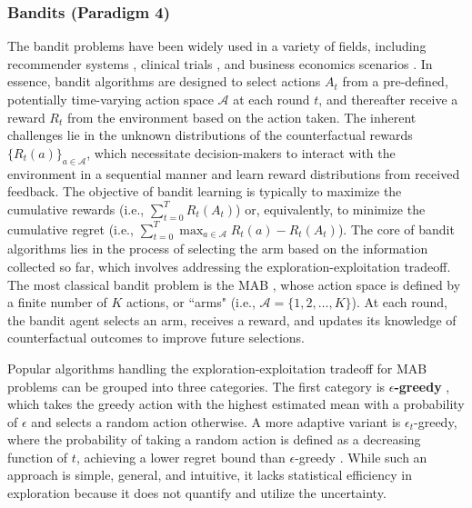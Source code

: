 \subsubsection{Bandits (Paradigm 4)} \label{sec:bandit_optimization}
The bandit problems have been widely used in a variety of fields, including recommender systems \citep{zhou2017large}, clinical trials \citep{durand2018contextual}, and business economics scenarios \citep{shen2015portfolio, wei2023zero}. 
In essence, bandit algorithms are designed to select actions $A_t$ from a pre-defined, potentially time-varying action space $\mathcal{A}$ at each round $t$, and thereafter receive a reward $R_t$ from the environment based on the action taken. 
The inherent challenges lie in the unknown distributions of the counterfactual rewards $\{R_t(a)\}_{a\in \mathcal{A}}$, which necessitate decision-makers to interact with the environment in a sequential manner and learn reward distributions from received feedback. 
The objective of bandit learning is typically to maximize the cumulative rewards (i.e., $\sum_{t=0}^{T}R_t(A_t)$) or, equivalently, to minimize the cumulative regret (i.e., $\sum_{t=0}^{T}\max_{a\in \mathcal{A}}R_t(a) - R_t(A_t)$). 
The core of bandit algorithms lies in the process of selecting the arm based on the information collected so far, which involves addressing the exploration-exploitation tradeoff.
The most classical bandit problem is the \acrshort{MAB} \citep{slivkins2019introduction, bouneffouf2019survey}, whose action space is defined by a finite number of $K$ actions, or ``arms" (i.e., $\mathcal{A} = \{1,2,\dots, K\}$). At each round, the bandit agent selects an arm, receives a reward, and updates its knowledge of counterfactual outcomes to improve future selections.


Popular algorithms handling the exploration-exploitation tradeoff for \acrshort{MAB} problems can be grouped into three categories. 
The first category is \textbf{$\epsilon$-greedy} \citep{sutton1999reinforcement}, which takes the greedy action with the highest estimated mean with a probability of $\epsilon$ and selects a random action otherwise. 
A more adaptive variant is $\epsilon_{t}$-greedy, where the probability of taking a random action is defined as a decreasing function of $t$, achieving a lower regret bound than $\epsilon$-greedy \citep{cesa1998finite, auer2002finite}. 
While such an approach is simple, general, and intuitive, it lacks statistical efficiency in exploration because it does not quantify and utilize the uncertainty. 

